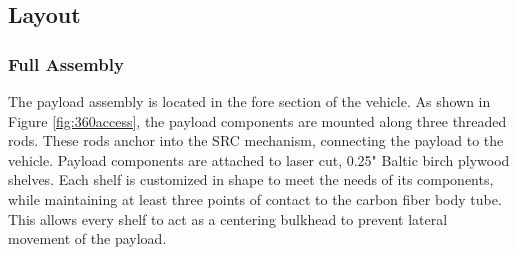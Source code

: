 \documentclass[class=article, crop=false]{standalone}
\begin{document}
	\subsection{Layout}
	\label{subsec:payload_layout}
	\subsubsection{Full Assembly}
	The payload assembly is located in the fore section of the vehicle. As shown in Figure \ref{fig:360access}, the payload components are mounted along three threaded rods. These rods anchor into the SRC mechanism, connecting the payload to the vehicle. Payload components are attached to laser cut, 0.25" Baltic birch plywood shelves. Each shelf is customized in shape to meet the needs of its components, while maintaining at least three points of contact to the carbon fiber body tube. This allows every shelf to act as a centering bulkhead to prevent lateral movement of the payload.
	
	\bigbreak
	
	
\end{document}
